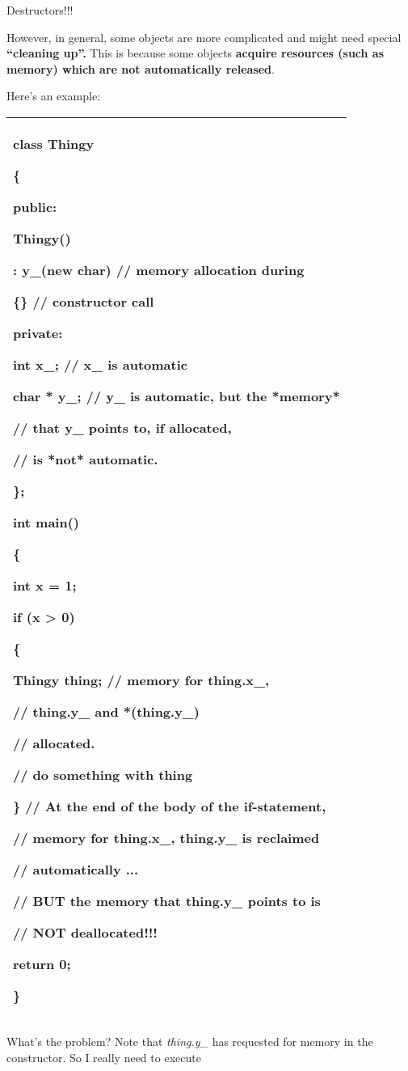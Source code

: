 \documentclass[
]{article}
\begin{document}
Destructors!!!

However, in general, some objects are more complicated and might need
special \textbf{``cleaning up''. }This is because some objects
\textbf{acquire resources (such as memory) which are not automatically
released}.

Here's an example:

\begin{longtable}[]{@{}l@{}}
\toprule
\endhead
\begin{minipage}[t]{0.97\columnwidth}\raggedright
class Thingy

\{

public:

Thingy()

: y\_(new char) // memory allocation during

\{\} // constructor call

private:

int x\_; // x\_ is automatic

char * y\_; // y\_ is automatic, but the *memory*

// that y\_ points to, if allocated,

// is *not* automatic.

\};

int main()

\{

int x = 1;

if (x \textgreater{} 0)

\{

Thingy thing; // memory for thing.x\_,

// thing.y\_ and *(thing.y\_)

// allocated.

// do something with thing

\} // At the end of the body of the if-statement,

// memory for thing.x\_, thing.y\_ is reclaimed

// automatically ...

// BUT the memory that thing.y\_ points to is

// NOT deallocated!!!

return 0;

\}\strut
\end{minipage}\tabularnewline
\bottomrule
\end{longtable}

What's the problem? Note that \emph{thing.y\_} has requested for memory
in the constructor. So I really need to execute
\end{document}

